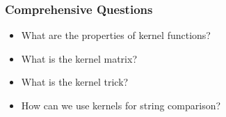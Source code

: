 \begin{frame}
	\frametitle{Comprehensive Questions}

	\begin{itemize}
		\item What are the properties of kernel functions? \\[1cm]
		\item What is the kernel matrix? \\[1cm]
		\item What is the kernel trick? \\[1cm]
		\item How can we use kernels for string comparison?
	\end{itemize}
\end{frame}
%
%
%           
%           
%           

